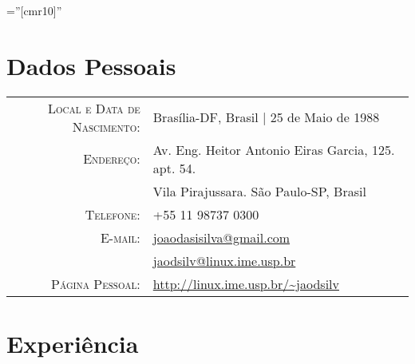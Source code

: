 \documentclass[a4paper,10pt]{article} %
\begin{document}
\pagestyle{empty} %

\font\fb=''[cmr10]'' %


\par{\bigskip\par} %

\section{Dados Pessoais}

\begin{tabular}{rl}
\textsc{Local e Data de Nascimento:} & Brasília-DF, Brasil | 25 de Maio de 1988 \\
\textsc{Endereço:} & Av. Eng. Heitor Antonio Eiras Garcia, 125. apt. 54.\\& Vila Pirajussara. São Paulo-SP, Brasil \\
\textsc{Telefone:} & +55 11 98737 0300\\
\textsc{E-mail:} & \href{mailto:joaodasisilva@gmail.com}{joaodasisilva@gmail.com}\\
& \href{mailto:jaodsilv@linux.ime.usp.br}{jaodsilv@linux.ime.usp.br}\\
\textsc{Página Pessoal:} & \href{http://linux.ime.usp.br/~jaodsilv}{http://linux.ime.usp.br/\textasciitilde{}jaodsilv}\\
\end{tabular}



\section{Experiência}
\end{document}
